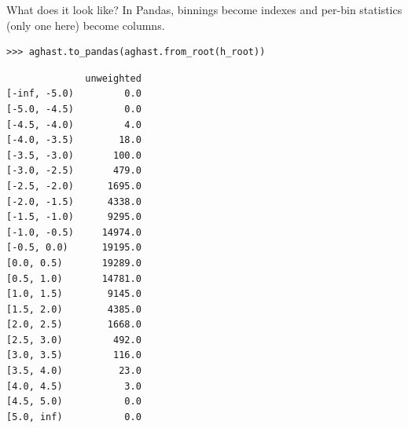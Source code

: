 \documentclass[aspectratio=169]{beamer}
\begin{document}
\begin{frame}[fragile]{What does it look like?}
\vspace{0.25 cm}
\small
In Pandas, binnings become indexes and per-bin statistics (only one here) become columns.
\begin{verbatim}
>>> aghast.to_pandas(aghast.from_root(h_root))
\end{verbatim}

\tiny
\begin{verbatim}
              unweighted
[-inf, -5.0)         0.0
[-5.0, -4.5)         0.0
[-4.5, -4.0)         4.0
[-4.0, -3.5)        18.0
[-3.5, -3.0)       100.0
[-3.0, -2.5)       479.0
[-2.5, -2.0)      1695.0
[-2.0, -1.5)      4338.0
[-1.5, -1.0)      9295.0
[-1.0, -0.5)     14974.0
[-0.5, 0.0)      19195.0
[0.0, 0.5)       19289.0
[0.5, 1.0)       14781.0
[1.0, 1.5)        9145.0
[1.5, 2.0)        4385.0
[2.0, 2.5)        1668.0
[2.5, 3.0)         492.0
[3.0, 3.5)         116.0
[3.5, 4.0)          23.0
[4.0, 4.5)           3.0
[4.5, 5.0)           0.0
[5.0, inf)           0.0
\end{verbatim}
\end{frame}

\end{document}
